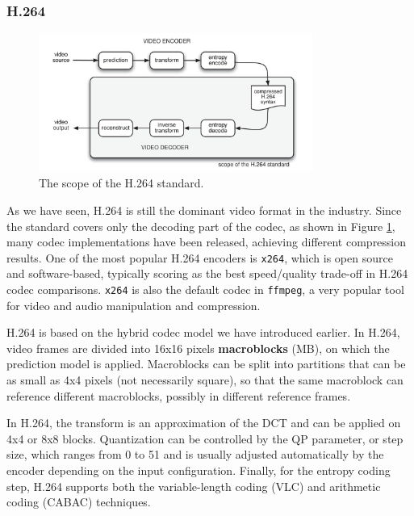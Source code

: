 \subsubsection{H.264}
\label{sec:bg/compression/codecs/h264}

\begin{figure}
	\centering
	
	\includegraphics[width=0.8\textwidth]{res/h264_scope.png}
	
	\caption{The scope of the H.264 standard.\cite{h264}}
	\label{fig:h264_scope}
\end{figure}

As we have seen, H.264 is still the dominant video format in the industry. Since the standard covers only the decoding part of the codec, as shown in Figure \ref{fig:h264_scope}, many codec implementations have been released, achieving different compression results. One of the most popular H.264 encoders is \texttt{x264}, which is open source and software-based, typically scoring as the best speed/quality trade-off in H.264 codec comparisons.\cite{msu2021} \texttt{x264} is also the default codec in \texttt{ffmpeg}, a very popular tool for video and audio manipulation and compression.

H.264 is based on the hybrid codec model we have introduced earlier. In H.264, video frames are divided into 16x16 pixels \textbf{macroblocks} (MB), on which the prediction model is applied. Macroblocks can be split into partitions that can be as small as 4x4 pixels (not necessarily square), so that the same macroblock can reference different macroblocks, possibly in different reference frames.

In H.264, the transform is an approximation of the DCT and can be applied on 4x4 or 8x8 blocks. Quantization can be controlled by the QP parameter, or step size, which ranges from 0 to 51 and is usually adjusted automatically by the encoder depending on the input configuration. Finally, for the entropy coding step, H.264 supports both the variable-length coding (VLC) and arithmetic coding (CABAC) techniques.

